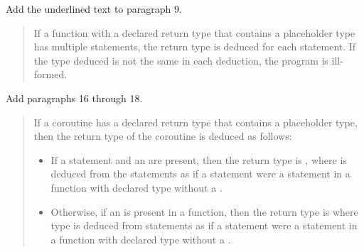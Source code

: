 Add the underlined text to paragraph 9.

\begin{quote}
\setcounter{Paras}{8}
\pnum
If a function with a declared return type that contains a placeholder type has
multiple  statements, the return type is deduced for each
 statement. If the type deduced is not the same in each
deduction, the program is ill-formed.
\end{quote}

Add paragraphs 16 through 18.

\begin{quote}
\setcounter{Paras}{15}

%

\pnum
If a coroutine has a declared return type that contains a placeholder type, then the return type of the coroutine is deduced as follows:

\begin{itemize}
\item If a  statement and an  are present, then
the return type is , where  is deduced from the  statements as if a  statement were a  statement in a function with declared type  without a .


\item Otherwise, if an  is present in a function, then
the return type is\linebreak {} where type  is deduced from 
 statements as if a  statement were a  statement in a function with declared type  without a .



\end{itemize}
\end{quote}
